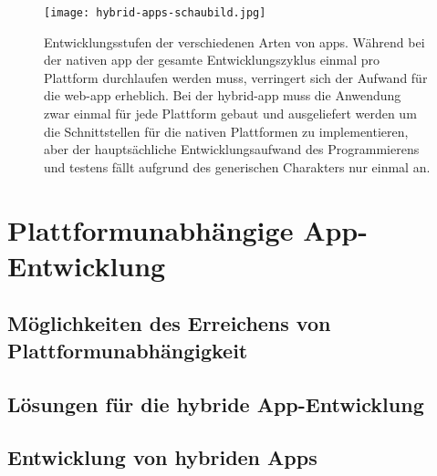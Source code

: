 \begin{figure}[h]
\centering
\texttt{[image: hybrid-apps-schaubild.jpg]}
\caption[Schaubild Hybrid Apps]{Entwicklungsstufen der verschiedenen Arten von \glspl{app}. Während bei der nativen \gls{app} der gesamte Entwicklungszyklus einmal pro Plattform durchlaufen werden muss, verringert sich der Aufwand für die \gls{web-app} erheblich. Bei der \gls{hybrid-app} muss die Anwendung zwar einmal für jede Plattform gebaut und ausgeliefert werden um die Schnittstellen für die nativen Plattformen zu implementieren, aber der hauptsächliche Entwicklungsaufwand des Programmierens und testens fällt aufgrund des generischen Charakters nur einmal an.}
\label{fig:hybrid-apps-schaubild}
\end{figure}

\section{Plattformunabhängige App-Entwicklung}

\subsection{Möglichkeiten des Erreichens von Plattformunabhängigkeit}

\subsection{Lösungen für die hybride App-Entwicklung}

\subsection{Entwicklung von hybriden Apps}\label{hybrid}

\begin{comment}
\subsection{Grundlegende Technologien}
Konkret heißt das, die Software wird als Webanwendung mit den zugehörigen Technologien (\gls{html}}, Javascript, \gls{css}) entwickelt und für die jeweiligen benötigten Plattformen in eine native \gls{app} eingebettet, welche hier allerdings hauptsächlich aus einer Web-View, also einer abgespeckten Variante eines Web-Browsers zur Anzeige der Webanwendung, besteht. Da dieser Ansatz der am häufigsten von Cross-Platform-Frameworks genutzte ist, \todo{nachweis!} stellt dieser auch den Schwerpunkt der in dieser Arbeit explorierten Technologien dar und soll hier näher erläutert werden. 
\end{comment}




